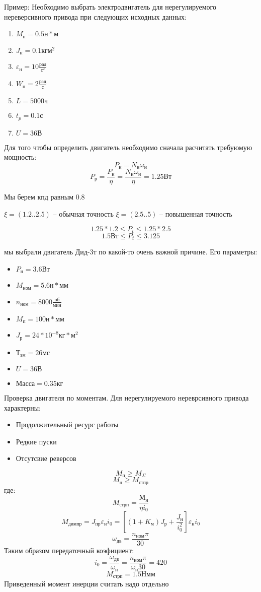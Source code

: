 \documentclass{article}
\begin{document}
Пример: Необходимо выбрать электродвигатель для нерегулируемого нереверсивного привода при следующих исходных данных:
\begin{enumerate}
	\item $M_н = 0.5 н * м$
	\item $J_н = 0.1 кг м^2$
	\item $\varepsilon_н = 10 \frac{рад}{с^2}$
	\item $W_н = 2 \frac{рад}{с} $
	\item $L = 5000 ч$
	\item $t_p = 0.1 с$
	\item $U = 36 В$
\end{enumerate}

Для того чтобы определить двигатель необходимо сначала расчитать требуюмую мощность:
$$
P_н = N_н \omega_н
$$
$$
P_р = \frac{P_н}{\eta} = \frac{N_н \omega_н}{ \eta} = 1.25 Вт
$$

Мы берем кпд равным 0.8


$\xi = (1.2 .. 2.5)$ -- обычная точность
$\xi = (2.5 .. 5)$ -- повышенная точность

$$
1.25 * 1.2 \le P_t \le 1.25 * 2.5
$$
$$
1.5 Вт \le P_t \le 3.125
$$

мы выбрали двигатель Дид-3т по какой-то очень важной причине. Его параметры:
\begin{itemize}
	\item $P_н = 3.6 Вт$
	\item $M_{ном} = 5.6 н * мм$
	\item $n_{ном} = 8000 \frac{об}{мин}$
	\item $M_п = 100 н * мм$
	\item $J_р = 24 * 10^{-8} кг * м^2$
	\item $Т_{эм} = 26 мс$
	\item $U = 36 В$
	\item $Масса = 0.35 кг$
\end{itemize}

Проверка двигателя по моментам. Для нерегулируемого нереврсивного привода характерны:
\begin{itemize}
	\item Продолжительный ресурс работы
	\item Редкие пуски
	\item Отсутсвие реверсов
\end{itemize}
$$
M_п \ge M_\Sigma
$$
$$
M_н \ge M_{стпр}
$$
где:
$$
M_{стрп} = \frac{М_н}{\eta i_0} 
$$
$$
M_{дим пр} = J_{пр} \varepsilon_н i_0 = [(1 + K_м)J_р + \frac{J_н}{i_0^2} ]\varepsilon_н i_0
$$
$$
\omega_{дв} = \frac{n_{ном} \pi}{30}
$$
Таким образом передаточный коэфициент:
$$
i_0 = \frac{ \omega_{дв}}{ \omega_н} = \frac{n_{ном} \pi}{ \omega_н 30} = 420
$$
$$
M_{стрп} = 1.5 Н мм
$$
Приведенный момент инерции считать надо отдельно
\end{document}
